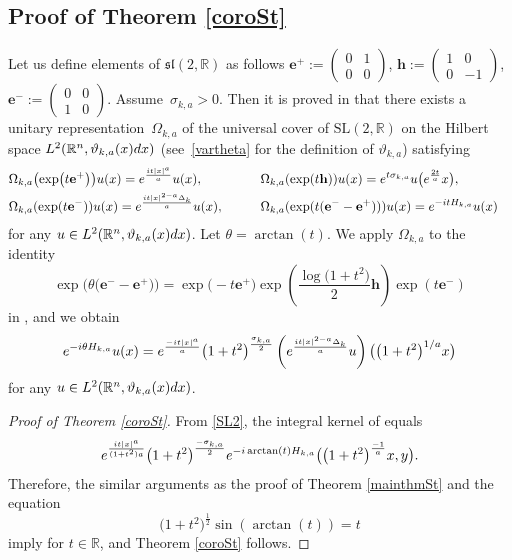 \documentclass[10pt,a4paper]{article}
\numberwithin{equation}{section}
\def\R{\mathbb{R}}%
\def\SL{\mathrm{SL}}
\def\sl{\mathfrak{sl}}
\newcommand{\bfe}{\mathbf{e}}
\newcommand{\bfh}{\mathbf{h}}
\begin{document}
\subsection[Proof of Theorem 1.3]{Proof of Theorem \ref{coroSt}}
Let us define elements of $\sl(2,\R)$ as follows
$
\bfe^+:=\left(\begin{smallmatrix}0&1\\0&0\end{smallmatrix}\right)$, $
\bfh:=\left(\begin{smallmatrix}1&0\\0&-1\end{smallmatrix}\right)$, $
\bfe^-:=\left(\begin{smallmatrix}0&0\\1&0\end{smallmatrix}\right)$.
Assume~${\sigma_{k,a}>0}$.
Then it is proved in \cite[Theorem 3.30]{BKO} that there exists a unitary representation~$\Omega_{k,a}$ of the universal cover \smash{$\widetilde{\SL}(2,\R)$} of $\SL(2,\R)$ on the Hilbert space $L^2(\R^n,\vartheta_{k,a}(x){\rm d}x)$ (see~\eqref{vartheta} for the definition of $\vartheta_{k,a}$) satisfying
\begin{alignat*}{3}
& \Omega_{k,a}\bigl(\exp\bigl(t\bfe^+\bigr)\bigr)u(x)={\rm e}^{\frac{{\rm i}t|x|^a}{a}}u(x),\qquad&& \Omega_{k,a}(\exp(t\mathbf{h}))u(x)={\rm e}^{t\sigma_{k,a}}u\bigl({\rm e}^{\frac{2t}{a}}x\bigr),& \\
& \Omega_{k,a}(\exp(t\bfe^-))u(x)={\rm e}^{\frac{{\rm i}t|x|^{2-a}\Delta_k}{a}}u(x),\qquad&&\Omega_{k,a}(\exp(t(\bfe^--\bfe^+)))u(x)={\rm e}^{-{\rm i}tH_{k,a}}u(x)&
\end{alignat*}
for any $u\in L^2(\R^n,\vartheta_{k,a}(x){\rm d}x)$.
Let $\theta=\arctan(t)$. We apply $\Omega_{k,a}$ to the identity
\[
\exp\bigl(\theta\bigl(\bfe^--\bfe^+\bigr)\bigr)=\exp\bigl(-t\bfe^+\bigr)\exp\left(\frac{\log\bigl(1+t^2\bigr)}{2}\bfh\right)\exp(t\bfe^-)
\]
in \smash{$\widetilde{\SL}(2,\R)$}, and we obtain
\begin{align}\label{SL2}
{\rm e}^{-{\rm i}\theta H_{k,a}}u(x)
={\rm e}^{\frac{-{\rm i}t|x|^a}{a}}\bigl(1+t^2\bigr)^{\frac{\sigma_{k,a}}{2}}\left({\rm e}^{\frac{{\rm i}t|x|^{2-a}\Delta_k}{a}}u\right)\bigl(\bigl(1+t^2\bigr)^{1/a}x\bigr)
\end{align}
for any $u\in L^2(\R^n,\vartheta_{k,a}(x){\rm d}x)$.

\begin{proof}[Proof of Theorem \ref{coroSt}]
From \eqref{SL2}, the integral kernel  of  equals
\begin{align*}
{\rm e}^{\frac{{\rm i}t|x|^a}{(1+t^2)a}}\bigl(1+t^2\bigr)^{\frac{-\sigma_{k,a}}{2}}{\rm e}^{-{\rm i}\arctan(t)H_{k,a}}\bigl(\bigl(1+t^2\bigr)^{\frac{-1}{a}}x,y\bigr).
\end{align*}
Therefore, the similar arguments as the proof of Theorem \ref{mainthmSt} and the equation
\[
\bigl(1+t^2\bigr)^{\frac{1}{2}}\sin(\arctan(t))=t
\]
 imply
 for $t\in\R$, and Theorem \ref{coroSt} follows.
\end{proof}
\end{document}
